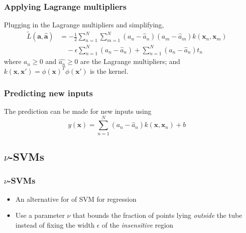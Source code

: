 \documentclass[t,14pt]{beamer}
\begin{document}
\begin{frame}
  \frametitle{Applying Lagrange multipliers}
  Plugging in the Lagrange multipliers and simplifying,
  \begin{align} 
    \widetilde{L}(\mathbf{a}, \widehat{\mathbf{a}}) &= 
        -\frac{\displaystyle 1}{\displaystyle 2}
        \sum\limits_{n=1}^N \sum\limits_{m=1}^N 
            (a_n - \widehat{a}_n)(a_m - \widehat{a}_m)
            k(\mathbf{x}_n,\mathbf{x}_m) \nonumber \\
            &\quad - \epsilon \sum\limits_{n=1}^N(a_n - \widehat{a}_n)
            + \sum\limits_{n=1}^N(a_n - \widehat{a}_n)t_n
  \end{align}
  where $a_n \geq 0$ and $\widehat{a_n} \geq 0$ are the Lagrange multipliers; 
  and\\
  $k(\mathbf{x}, \mathbf{x'}) = \phi(\mathbf{x})^T \phi(\mathbf{x'})$ is the 
  kernel.
\end{frame} 

\begin{frame}
  \frametitle{Predicting new inputs}
  The prediction can be made for new inputs using
  \begin{equation}
    y(\mathbf{x}) = \sum\limits_{n=1}^N (a_n - \widehat{a}_n)
                                        k(\mathbf{x}, \mathbf{x}_n)
                    + b
  \end{equation}
\end{frame}

\subsection{$\nu$-SVMs}

\begin{frame}
  \frametitle{$\nu$-SVMs}
  \begin{itemize}
    \item {An alternative for of SVM for regression}
    \item {
            Use a parameter $\nu$ that bounds the fraction of points lying 
            \textit{outside} the tube instead of fixing the width $\epsilon$ 
            of the \textit{insensitive} region
          }
  \end{itemize}
\end{frame}
\end{document}
